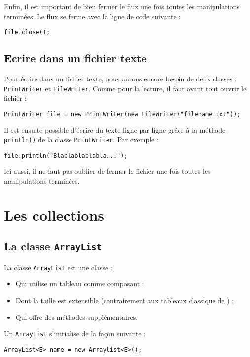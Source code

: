 Enfin, il est important de bien fermer le flux une fois toutes les manipulations terminées. Le flux se ferme avec la ligne de code suivante :

\begin{lstlisting}
file.close();
\end{lstlisting}

\subsection{Ecrire dans un fichier texte}
Pour écrire dans un fichier texte, nous aurons encore besoin de deux classes : \lstinline|PrintWriter| et \lstinline|FileWriter|. Comme pour la lecture, il faut avant tout ouvrir le fichier :

\begin{lstlisting}
PrintWriter file = new PrintWriter(new FileWriter("filename.txt"));
\end{lstlisting}

Il est ensuite possible d'écrire du texte ligne par ligne grâce à la méthode \lstinline|println()| de la classe \lstinline|PrintWriter|. Par exemple :

\begin{lstlisting}
file.println("Blablablablabla...");
\end{lstlisting}

Ici aussi, il ne faut pas oublier de fermer le fichier une fois toutes les manipulations terminées.

\section{Les collections}
\subsection{La classe \lstinline|ArrayList|}
La classe \lstinline|ArrayList| est une classe :

\begin{itemize}
\item Qui utilise un tableau comme composant ;
\item Dont la taille est extensible (contrairement aux tableaux classique de \java{}) ;
\item Qui offre des méthodes supplémentaires.
\end{itemize}

Un \lstinline|ArrayList| s'initialise de la façon suivante :

\begin{lstlisting}
ArrayList<E> name = new Arraylist<E>();
\end{lstlisting}

